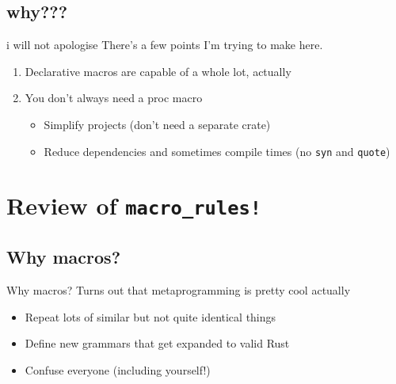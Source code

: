 \documentclass{beamer}
\begin{document}
	\subsection{why???}
	\begin{frame}{i will not apologise}
		There's a few points I'm trying to make here.

		\pause

		\begin{enumerate}
			\item Declarative macros are capable of a whole lot, actually

			\pause

			\item You don't always need a proc macro
			\begin{itemize}
				\item Simplify projects (don't need a separate crate)
				\item Reduce dependencies and sometimes compile times (no \texttt{syn} and
					\texttt{quote})
			\end{itemize}
		\end{enumerate}
	\end{frame}

	\section[Review of macro\_rules!]{Review of {\color{macrorulescolor}\texttt{macro\_rules!}}}
	\subsection{Why macros?}
	\begin{frame}{Why macros?}
		Turns out that metaprogramming is pretty cool actually \\

		\begin{itemize}
			\item Repeat lots of similar but not quite identical things
			\pause
			\item Define new grammars that get expanded to valid Rust
			\pause
			\item Confuse everyone (including yourself!)
		\end{itemize}
	\end{frame}
\end{document}

